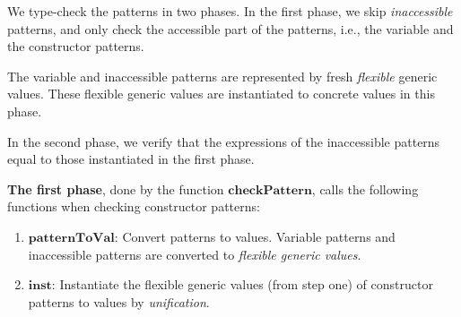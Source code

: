 We type-check the patterns in two phases. In the first phase, we skip \emph{inaccessible} patterns, and only check the accessible part of the patterns, i.e., the variable and the constructor patterns.

The variable and inaccessible patterns are represented by fresh \emph{flexible} generic values. These flexible generic values are instantiated to concrete values in this phase.

In the second phase, we verify that the expressions of the inaccessible patterns equal to those instantiated in the first phase.

\textbf{The first phase}, done by the function $\boldsymbol{checkPattern}$, calls the following functions when checking constructor patterns:

\begin{enumerate}
  \item $\boldsymbol{patternToVal}$: Convert patterns to values. Variable patterns and inaccessible patterns are converted to \emph{flexible generic values}.
  \item $\boldsymbol{inst}$: Instantiate the flexible generic values (from step one) of constructor patterns to values by \emph{unification}.
\end{enumerate}

